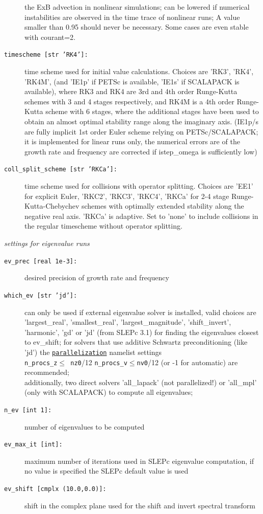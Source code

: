 \documentclass[12pt]{article}
\begin{document}
\begin{description}
  the ExB advection in nonlinear simulations; can be lowered if numerical instabilities are observed in the
  time trace of nonlinear runs; A value smaller than 0.95 should never be necessary. Some cases are even stable with courant=2.
\item[\texttt{timescheme [str 'RK4']:}] time scheme used for initial value calculations. Choices are
  'RK3', 'RK4', 'RK4M', (and 'IE1p' if PETSc is available, 'IE1s' if SCALAPACK is available),
  where RK3 and RK4 are 3rd and 4th order Runge-Kutta schemes
  with 3 and 4 stages respectively, and RK4M is a 4th order Runge-Kutta scheme with 6 stages, where the
  additional stages have  been used to obtain an almost optimal stability range along the imaginary axis.
  (IE1p/s are fully implicit 1st order Euler scheme relying on PETSc/SCALAPACK;
  it is implemented for linear runs only, the numerical
  errors are of the growth rate and frequency are corrected if istep\_omega is sufficiently low)
\item[\texttt{coll\_split\_scheme [str 'RKCa']:}] time scheme used for
  collisions with operator splitting. Choices are 'EE1' for explicit
  Euler, 'RKC2', 'RKC3', 'RKC4', 'RKCa' for 2-4 stage Runge-Kutta-Chebychev schemes with
  optimally extended stability along the negative real axis. 'RKCa' is
  adaptive. Set to 'none' to include collisions in the regular
  timescheme without operator splitting.
\end{description}
%
{\em settings for eigenvalue runs}
\begin{description}
\item[\hypertarget{ev\_prec}{\tt ev\_prec [real 1e-3]:}]
  desired precision of growth rate and frequency
\item[\texttt{which\_ev [str 'jd']:}] can only be used if external eigenvalue solver is installed, valid choices are
  'largest\_real', 'smallest\_real', 'largest\_magnitude',
  'shift\_invert', 'harmonic', 'gd' or 'jd' (from SLEPc 3.1) for finding
  the eigenvalues closest to ev\_shift; for solvers that use
  additive Schwartz preconditioning (like 'jd') the
  \hyperlink{parallelization_nml}{{\tt parallelization}} namelist
  settings \\{\tt n\_procs\_z}$\leq${\tt
  nz0}/12 {\tt n\_procs\_v}$\leq${\tt nv0}/12 (or -1 for automatic) are
  recommended;\\
  additionally, two direct solvers 'all\_lapack' (not parallelized!) or 'all\_mpl'
  (only with SCALAPACK) to compute all eigenvalues;
\item[\hypertarget{n_ev}{\texttt{n\_ev [int 1]:}}] number of eigenvalues to be computed
\item[\texttt{ev\_max\_it [int]:}] maximum number of iterations used in SLEPc eigenvalue computation,
  if no value is specified the SLEPc default value is used
\item[\texttt{ev\_shift [cmplx (10.0,0.0)]:}] shift in the complex plane used for the shift and invert spectral transform
\end{description}
\end{document}
